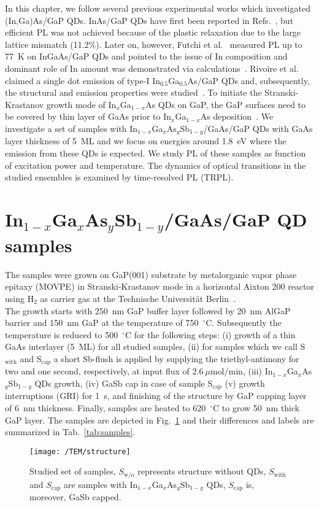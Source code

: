 In this chapter, we follow several previous experimental works which investigated {(In,Ga)As/GaP} QDs. InAs/GaP QDs have first been reported in Refs.~\citep{Leon_apl1998, guo_solidi2009}, but efficient PL was not achieved because of the plastic relaxation due to the large lattice mismatch (11.2\%). Later on, however, Futchi et al.~\citep{Fuchi_physicaE2004} measured PL up to 77~K on InGaAs/GaP QDs and pointed to the issue of In composition and dominant role of In amount was demonstrated via calculations~\citep{Fukami_solodi2011}. Rivoire et al.~\citep{Rivoire_prb2012} claimed a single dot emission of type-I In$_{0.5}$Ga$_{0.5}$As/GaP QDs and, subsequently, the structural and emission properties were studied~\cite{Stracke_apl2014, Sala_apl2016}. To initiate the Stranski-Krastanov growth mode of In$_x$Ga$_{1-x}$As QDs on GaP, the GaP surfaces need to be covered by thin layer of GaAs prior to In$_x$Ga$_{1-x}$As deposition~\citep{stracke_apl2012_qdflash_GaP}.
%
%
%
%
We investigate a set of samples with In$_{1-x}$Ga$_{x}$As$_y$Sb$_{1-y}$/GaAs/GaP QDs with GaAs layer thickness of 5~ML and we focus on energies around 1.8~eV where the emission from these QDs is expected. We study PL of these samples as function of excitation power and temperature. The dynamics of optical transitions in the studied ensembles is examined by time-resolved PL (TRPL).


\section{In$_{1-x}$Ga$_{x}$As$_y$Sb$_{1-y}$/GaAs/GaP QD samples}
The samples were grown on GaP(001) substrate by metalorganic vapor phase epitaxy (MOVPE) in Stranski-Krastanov mode in a horizontal Aixton 200 reactor using H$_2$ as carrier gas at the Technische Universität Berlin~\citep{Sala_apl2016}. \\
%
\indent The growth starts with 250~nm GaP buffer layer followed by 20~nm AlGaP barrier and 150~nm GaP at the temperature of 750~$^\circ$C. Subsequently the temperature is reduced to 500~$^\circ$C for the following steps: (i) growth of a thin GaAs interlayer (5~ML) for all studied samples, (ii) for samples which we call S$_\mathrm{with}$ and S$_\mathrm{cap}$ a short Sb-flush is applied by supplying the triethyl-antimony for two and one second, respectively, at input flux of $2.6~\mu\mathrm{mol/min}$, (iii) In$_{1-x}$Ga$_{x}$As$_y$Sb$_{1-y}$ QDs growth, (iv) GaSb cap in case of sample S$_\mathrm{cap}$ (v) growth interruptions (GRI) for 1~s, and finishing of the structure by GaP capping layer of 6~nm thickness. Finally, samples are heated to 620~$^\circ$C to grow 50~nm thick GaP layer. The samples are depicted in Fig.~\ref{fig:TUstructure} and their differences and labels are summarized in Tab.~\ref{tab:samples}.
\begin{figure}
	\centering
	\texttt{[image: /TEM/structure]}
	\caption{Studied set of samples, $S_\mathrm{w/o}$ represents structure without QDs, $S_\mathrm{with}$ and $S_\mathrm{cap}$ are samples with In$_{1-x}$Ga$_{x}$As$_y$Sb$_{1-y}$ QDs, $S_\mathrm{cap}$ is, moreover, GaSb capped. }
	\label{fig:TUstructure}
\end{figure}

